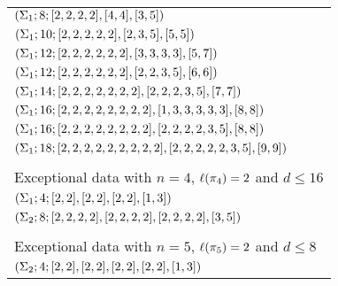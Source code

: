 \begin{tabularx}{\mytablewidth}{l}
$(\Sigma_{1};8;[2, 2, 2, 2],[4, 4],[3, 5])$\\
$(\Sigma_{1};10;[2, 2, 2, 2, 2],[2, 3, 5],[5, 5])$\\
$(\Sigma_{1};12;[2, 2, 2, 2, 2, 2],[3, 3, 3, 3],[5, 7])$\\
$(\Sigma_{1};12;[2, 2, 2, 2, 2, 2],[2, 2, 3, 5],[6, 6])$\\
$(\Sigma_{1};14;[2, 2, 2, 2, 2, 2, 2],[2, 2, 2, 3, 5],[7, 7])$\\
$(\Sigma_{1};16;[2, 2, 2, 2, 2, 2, 2, 2],[1, 3, 3, 3, 3, 3],[8, 8])$\\
$(\Sigma_{1};16;[2, 2, 2, 2, 2, 2, 2, 2],[2, 2, 2, 2, 3, 5],[8, 8])$\\
$(\Sigma_{1};18;[2, 2, 2, 2, 2, 2, 2, 2, 2],[2, 2, 2, 2, 2, 3, 5],[9, 9])$\\
\bottomrule\\[1em]
\toprule
\multicolumn{1}{l}{Exceptional data with $n=4$, $\ell(\pi_4)=2$ and $d\le 16$}\\
\midrule
$(\Sigma_{1};4;[2, 2],[2, 2],[2, 2],[1, 3])$\\
$(\Sigma_{2};8;[2, 2, 2, 2],[2, 2, 2, 2],[2, 2, 2, 2],[3, 5])$\\
\bottomrule\\[1em]
\toprule
\multicolumn{1}{l}{Exceptional data with $n=5$, $\ell(\pi_5)=2$ and $d\le 8$}\\
\midrule
$(\Sigma_{2};4;[2, 2],[2, 2],[2, 2],[2, 2],[1, 3])$\\
\bottomrule
\end{tabularx}

\egroup